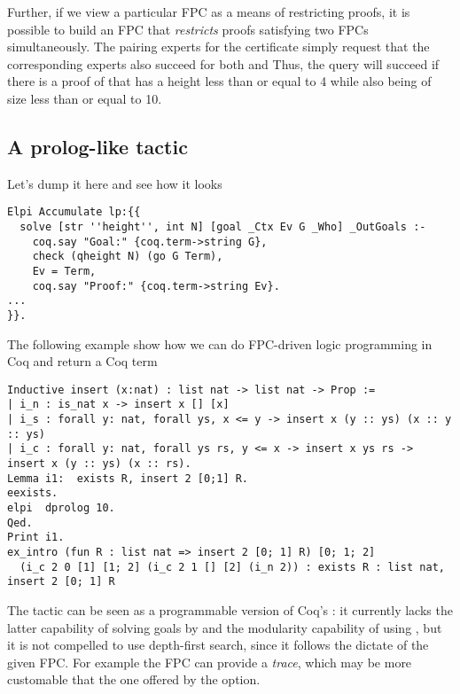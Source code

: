 Further, if we view a particular FPC as a means of restricting proofs, it is
possible to build an FPC that \emph{restricts} proofs satisfying two FPCs
simultaneously.
%
%
The pairing experts for the certificate  simply
request that the corresponding experts also succeed for both
 and  
%
Thus, the query 
will succeed if there is a proof of  that has a height less
than or equal to 4 while also being of size less than or equal to 10.



\subsection{A prolog-like tactic}

\begin{metanote}
  Let's dump it here and see how it looks
\end{metanote}

\begin{lstlisting}
Elpi Accumulate lp:{{
  solve [str ''height'', int N] [goal _Ctx Ev G _Who] _OutGoals :-
    coq.say "Goal:" {coq.term->string G},
    check (qheight N) (go G Term),
    Ev = Term,
    coq.say "Proof:" {coq.term->string Ev}.
...
}}.
\end{lstlisting}
The following example show how we can do FPC-driven logic programming in Coq and return
a Coq term
\begin{lstlisting}
Inductive insert (x:nat) : list nat -> list nat -> Prop :=
| i_n : is_nat x -> insert x [] [x]
| i_s : forall y: nat, forall ys, x <= y -> insert x (y :: ys) (x :: y :: ys)
| i_c : forall y: nat, forall ys rs, y <= x -> insert x ys rs -> insert x (y :: ys) (x :: rs).
Lemma i1:  exists R, insert 2 [0;1] R.
eexists.
elpi  dprolog 10.
Qed.
Print i1.
ex_intro (fun R : list nat => insert 2 [0; 1] R) [0; 1; 2]
  (i_c 2 0 [1] [1; 2] (i_c 2 1 [] [2] (i_n 2)) : exists R : list nat, insert 2 [0; 1] R
\end{lstlisting}

The  tactic can be seen as a programmable version of
Coq's : it currently lacks the latter capability of solving
goals by  and the modularity capability of using
, but it is not compelled to use depth-first search, since it follows the dictate of the given FPC. For example the FPC can provide a \emph{trace}, which may be more customable that the one offered by the  option.
%

